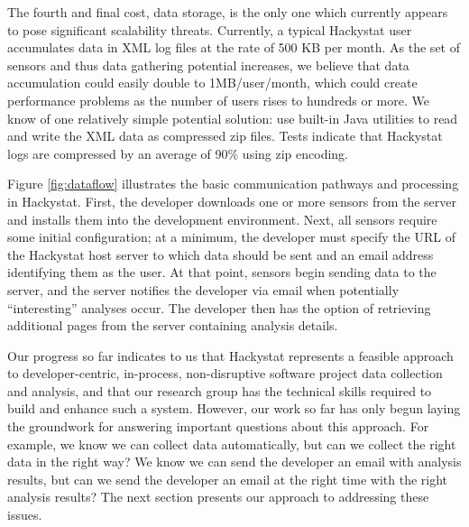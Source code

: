 The fourth and
final cost, data storage, is the only one which currently appears to pose
significant scalability threats. Currently, a typical Hackystat user
accumulates data in XML log files at the rate of 500 KB per month. As the
set of sensors and thus data gathering potential increases, we believe that
data accumulation could easily double to 1MB/user/month, which could create
performance problems as the number of users rises to hundreds or more. We
know of one relatively simple potential solution: use built-in Java
utilities to read and write the XML data as compressed zip files. Tests
indicate that Hackystat logs are compressed by an average of 90\% using zip 
encoding. 


Figure \ref{fig:dataflow} illustrates the basic communication pathways and
processing in Hackystat.  First, the developer downloads one or more
sensors from the server and installs them into the development environment.
Next, all sensors require some initial configuration; at a minimum, the
developer must specify the URL of the Hackystat host server to which data
should be sent and an email address identifying them as the user. At that
point, sensors begin sending data to the server, and the server notifies
the developer via email when potentially ``interesting'' analyses occur.
The developer then has the option of retrieving additional pages from the
server containing analysis details.



Our progress so far indicates to us that Hackystat represents a feasible
approach to developer-centric, in-process, non-disruptive software project
data collection and analysis, and that our research group has the technical
skills required to build and enhance such a system.  However, our work so
far has only begun laying the groundwork for answering important questions
about this approach.  For example, we know we can collect data
automatically, but can we collect the right data in the right way?  We know
we can send the developer an email with analysis results, but can we send
the developer an email at the right time with the right analysis results?
The next section presents our approach to addressing these issues.




 




